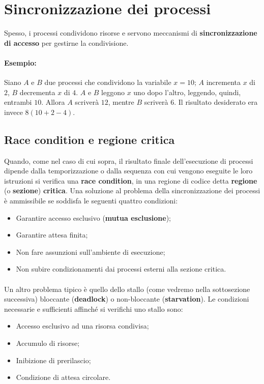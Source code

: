 \documentclass{article}
\begin{document}
\section{Sincronizzazione dei processi} Spesso, i processi condividono risorse e servono meccanismi di \textbf{sincronizzazione di accesso} per gestirne la condivisione.

\paragraph{Esempio:} Siano $A$ e $B$ due processi che condividono la variabile $x = 10$; $A$ incrementa $x$ di $2$, $B$ decrementa $x$ di $4$. $A$ e $B$ leggono $x$ uno dopo l'altro, leggendo, quindi, entrambi $10$. Allora $A$ scriverà $12$, mentre $B$ scriverà $6$. Il risultato desiderato era invece $8 (10+2-4)$.

\subsection{Race condition e regione critica} Quando, come nel caso di cui sopra, il risultato finale dell'esecuzione di processi dipende dalla temporizzazione o dalla sequenza con cui vengono eseguite le loro istruzioni si verifica una \textbf{race condition}, in una regione di codice detta \textbf{regione} (o \textbf{sezione}) \textbf{critica}. Una soluzione al problema della sincronizzazione dei processi è ammissibile se soddisfa le seguenti quattro condizioni:
\begin{itemize}
    \item Garantire accesso esclusivo (\textbf{mutua esclusione});
    \item Garantire attesa finita;
    \item Non fare assunzioni sull'ambiente di esecuzione;
    \item Non subire condizionamenti dai processi esterni alla sezione critica.
\end{itemize}

\paragraph{} Un altro problema tipico è quello dello stallo (come vedremo nella sottosezione successiva) bloccante (\textbf{deadlock}) o non-bloccante (\textbf{starvation}). Le condizioni necessarie e sufficienti affinché si verifichi uno stallo sono:

\begin{itemize}
    \item Accesso esclusivo ad una risorsa condivisa;
    \item Accumulo di risorse;
    \item Inibizione di prerilascio;
    \item Condizione di attesa circolare.
\end{itemize}
\end{document}
